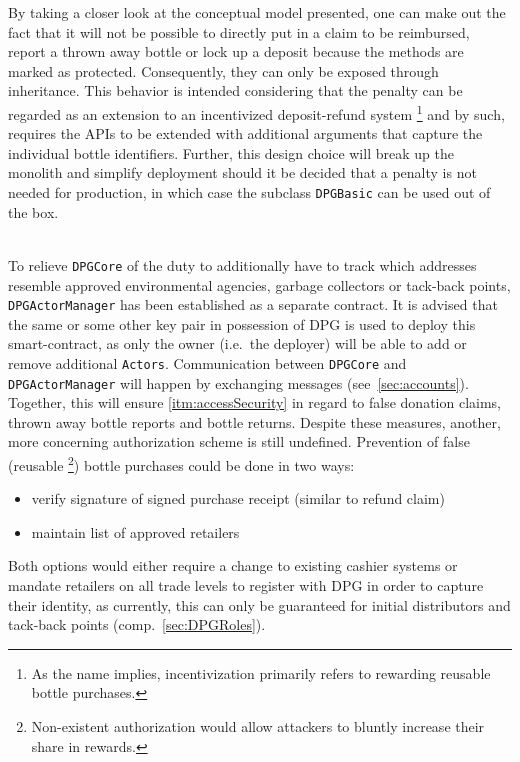 \begin{description}[format={\storedescriptionlabel}]
	By taking a closer look at the conceptual model presented, one can make out the fact that it will not be possible to directly put in a claim to be reimbursed, report a thrown away bottle or lock up a deposit because the methods are marked as protected. Consequently, they can only be exposed through inheritance. This behavior is intended considering that the penalty can be regarded as an extension to an incentivized deposit-refund system \footnote{As the name implies, incentivization primarily refers to rewarding reusable bottle purchases.} and by such, requires the APIs to be extended with additional arguments that capture the individual bottle identifiers. Further, this design choice will break up the monolith and simplify deployment should it be decided that a penalty is not needed for production, in which case the subclass \texttt{DPGBasic} can be used out of the box.
	\item[Access Control\label{itm:accessControl}]
	\hfill \\
	To relieve \texttt{DPGCore} of the duty to additionally have to track which addresses resemble approved environmental agencies, garbage collectors or tack-back points, \texttt{DPGActorManager} has been established as a separate contract. It is advised that the same or some other key pair in possession of \ac{DPG} is used to deploy this smart-contract, as only the owner (i.e.~the deployer) will be able to add or remove additional \texttt{Actors}. Communication between \texttt{DPGCore} and \texttt{DPGActorManager} will happen by exchanging messages (see~\ref{sec:accounts}). Together, this will ensure \ref{itm:accessSecurity} in regard to false donation claims, thrown away bottle reports and bottle returns. Despite these measures, another, more concerning authorization scheme is still undefined. Prevention of false (reusable \footnote{Non-existent authorization would allow attackers to bluntly increase their share in rewards.}) bottle purchases could be done in two ways:
	
	\begin{itemize}
  		\item verify signature of signed purchase receipt (similar to refund claim)
  		\item maintain list of approved retailers
	\end{itemize}

	Both options would either require a change to existing cashier systems or mandate retailers on all trade levels to register with \ac{DPG} in order to capture their identity, as currently, this can only be guaranteed for initial distributors and tack-back points (comp.~\ref{sec:DPGRoles}).
	

\end{description}
